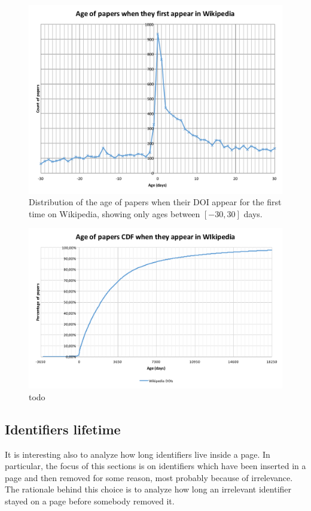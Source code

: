 \begin{figure}[h]
\centering
\includegraphics[keepaspectratio=true, width=\textwidth]{assets/age_of_papers_at_first_appearance_-30+30}
\caption{Distribution of the age of papers when their DOI appear for the first time on Wikipedia, showing only ages between $[-30, 30]$ days.}
\label{fig:age_of_papers_at_first_appearance_zoom}
\end{figure}

\begin{figure}[h]
\centering
\includegraphics[keepaspectratio=true, width=\textwidth]{assets/age_of_papers_at_first_appearance_cdf}
\caption{todo}
\label{fig:age_of_papers_at_first_appearance_cdf}
\end{figure}

\subsection{Identifiers lifetime}
It is interesting also to analyze how long identifiers live inside a page.
In particular, the focus of this sections is on identifiers which have been inserted in a page and then removed for some reason, most probably because of irrelevance.
The rationale behind this choice is to analyze how long an irrelevant identifier stayed on a page before somebody removed it.


